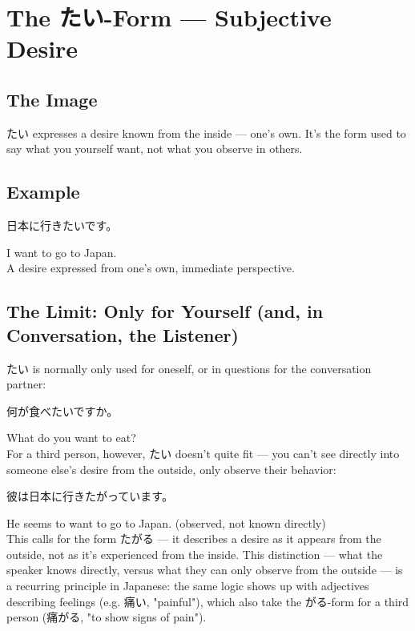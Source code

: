 \documentclass[12pt]{book}
\begin{document}
\chapter{The たい-Form — Subjective Desire}

\section*{The Image}

たい expresses a desire known from the inside — one's own. It's the form used to say what you yourself want, not what you observe in others.

\section*{Example}

\par\quad 日本に行きたいです。\\
\par\quad I want to go to Japan.\\

A desire expressed from one's own, immediate perspective.

\section*{The Limit: Only for Yourself (and, in Conversation, the Listener)}

たい is normally only used for oneself, or in questions for the conversation partner:

\par\quad 何が食べたいですか。\\
\par\quad What do you want to eat?\\

For a third person, however, たい doesn't quite fit — you can't see directly into someone else's desire from the outside, only observe their behavior:

\par\quad 彼は日本に行きたがっています。\\
\par\quad He seems to want to go to Japan. (observed, not known directly)\\

This calls for the form たがる — it describes a desire as it appears from the outside, not as it's experienced from the inside. This distinction — what the speaker knows directly, versus what they can only observe from the outside — is a recurring principle in Japanese: the same logic shows up with adjectives describing feelings (e.g. 痛い, "painful"), which also take the がる-form for a third person (痛がる, "to show signs of pain").
\end{document}
